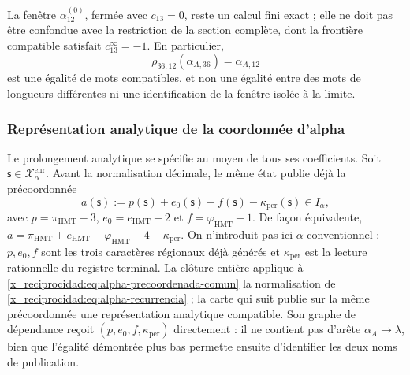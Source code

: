 La fenêtre \(\alpha_{12}^{(0)}\), fermée avec \(c_{13}=0\), reste un
calcul fini exact ; elle ne doit pas être confondue avec la restriction de la section
complète, dont la frontière compatible satisfait \(c_{13}^{\infty}=-1\). En
particulier,
\begin{equation}
 \rho_{36,12}(\alpha_{A,36})=\alpha_{A,12}
 \label{x_reciprocidad:eq:alpha-rho-36-12-proyectiva}
\end{equation}
est une égalité de mots compatibles, et non une égalité entre des mots de
longueurs différentes ni une identification de la fenêtre isolée à la
limite.



\subsubsection{Représentation analytique de la coordonnée d'alpha}
\label{x_reciprocidad:subsec:alpha-lector-completo-rev08}

Le prolongement analytique se spécifie au moyen de tous ses coefficients.
Soit \(\mathsf s\in\mathcal X_\alpha^{\mathrm{enr}}\). Avant
la normalisation décimale, le même état publie déjà la précoordonnée
\begin{equation}
 a(\mathsf s):=p(\mathsf s)+e_0(\mathsf s)-f(\mathsf s)
                 -\kappa_{\mathrm{per}}(\mathsf s)\in I_\alpha,
 \label{x_reciprocidad:eq:alpha-precoordenada-comun}
\end{equation}
avec \(p=\pi_{\mathrm{HMT}}-3\),
\(e_0=e_{\mathrm{HMT}}-2\) et
\(f=\varphi_{\mathrm{HMT}}-1\). De façon équivalente,
\(a=\pi_{\mathrm{HMT}}+e_{\mathrm{HMT}}-
\varphi_{\mathrm{HMT}}-4-\kappa_{\mathrm{per}}\). On n'introduit pas ici
\(\alpha\) conventionnel : \(p,e_0,f\) sont les trois caractères régionaux déjà
générés et \(\kappa_{\mathrm{per}}\) est la lecture rationnelle du registre
terminal. La clôture entière applique à
\eqref{x_reciprocidad:eq:alpha-precoordenada-comun} la normalisation de
\eqref{x_reciprocidad:eq:alpha-recurrencia} ; la carte qui suit publie sur la même
précoordonnée une représentation analytique compatible. Son graphe de
dépendance reçoit \((p,e_0,f,\kappa_{\mathrm{per}})\) directement : il ne
contient pas d'arête \(\alpha_A\to\lambda\), bien que l'égalité démontrée plus
bas permette ensuite d'identifier les deux noms de publication.

